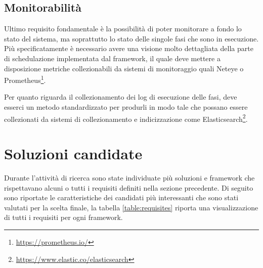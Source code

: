 \subsection{Monitorabilità}
\label{sub:monitorable}

Ultimo requisito fondamentale è la possibilità di poter monitorare a fondo lo
stato del sistema, ma soprattutto lo stato delle singole fasi che sono in esecuzione.
Più specificatamente è necessario avere una visione molto dettagliata della
parte di schedulazione implementata dal framework, il quale deve mettere a disposizione
metriche collezionabili da sistemi di monitoraggio quali Neteye\cite{neteye} o
Prometheus\footnote{\url{https://prometheus.io/}}.

Per quanto riguarda il collezionamento dei log di esecuzione delle fasi, deve
esserci un metodo standardizzato per produrli in modo tale che possano essere
collezionati da sistemi di collezionamento e indicizzazione come Elasticsearch\footnote{\url{https://www.elastic.co/elasticsearch}}.

\section{Soluzioni candidate}
\label{sec:candidates}

Durante l'attività di ricerca sono state individuate più soluzioni e framework
che rispettavano alcuni o tutti i requisiti definiti nella sezione precedente. Di
seguito sono riportate le caratteristiche dei candidati più interessanti che sono
stati valutati per la scelta finale, la tabella \ref{table:requisites} riporta
una visualizzazione di tutti i requisiti per ogni framework.

